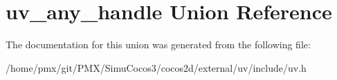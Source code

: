 \hypertarget{unionuv__any__handle}{}\section{uv\+\_\+any\+\_\+handle Union Reference}
\label{unionuv__any__handle}


The documentation for this union was generated from the following file\+:\begin{DoxyCompactItemize}
\item 
/home/pmx/git/\+P\+M\+X/\+Simu\+Cocos3/cocos2d/external/uv/include/uv.\+h\end{DoxyCompactItemize}
